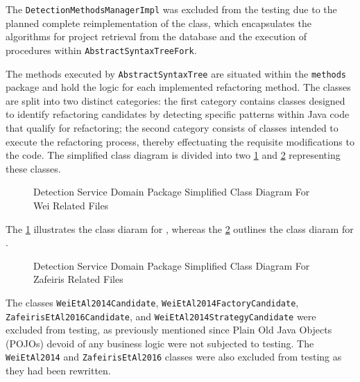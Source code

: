 The \texttt{DetectionMethodsManagerImpl} was excluded from the testing due to the planned complete reimplementation of the class, which encapsulates the algorithms for project retrieval from the database and the execution of procedures within \texttt{AbstractSyntaxTreeFork}.

The methods executed by \texttt{AbstractSyntaxTree} are situated within the \texttt{methods} package and hold the logic for each implemented refactoring method. The classes are split into two distinct categories: the first category contains classes designed to identify refactoring candidates by detecting specific patterns within Java code that qualify for refactoring; the second category consists of classes intended to execute the refactoring process, thereby effectuating the requisite modifications to the code. The simplified class diagram is divided into two \cref{fig-class-detection-domain-wei} and \cref{fig-class-detection-domain-zafeiris} representing these classes.

\begin{figure}[ht!]
\SetCaptionWidth{\textwidth}
\caption{Detection Service Domain Package Simplified Class Diagram For Wei Related Files}
\label{fig-class-detection-domain-wei}
\fontsize{4}{5}\selectfont

\end{figure}
\FloatBarrier

The \cref{fig-class-detection-domain-wei} illustrates the class diaram for \cite{liu2014automated}, whereas the \cref{fig-class-detection-domain-zafeiris} outlines the class diaram for \cite{zafeiris2017automated}.

\begin{figure}[ht!]
\SetCaptionWidth{\textwidth}
\caption{Detection Service Domain Package Simplified Class Diagram For Zafeiris Related Files}
\label{fig-class-detection-domain-zafeiris}
\fontsize{5}{8}\selectfont

\end{figure}
\FloatBarrier

The classes \texttt{WeiEtAl2014Candidate}, \texttt{WeiEtAl2014FactoryCandidate}, \texttt{ZafeirisEtAl2016Candidate}, and \texttt{WeiEtAl2014StrategyCandidate} were excluded from testing, as previously mentioned since Plain Old Java Objects (POJOs) devoid of any business logic were not subjected to testing. The \texttt{WeiEtAl2014} and \texttt{ZafeirisEtAl2016} classes were also excluded from testing as they had been rewritten.

